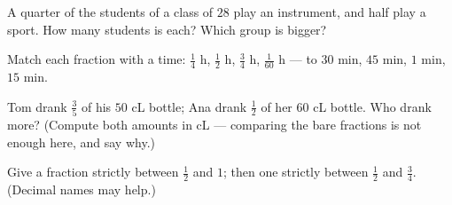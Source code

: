 \begin{exercise}[$\star$]\label{exo:g5:fractions:8}
A quarter of the students of a class of $28$ play an instrument, and
half play a sport. How many students is each? Which group is bigger?
\end{exercise}

\begin{exercise}[$\star$]\label{exo:g5:fractions:9}
Match each fraction with a time: $\frac14$ h, $\frac12$ h,
$\frac34$ h, $\frac{1}{60}$ h --- to $30$ min, $45$ min, $1$ min,
$15$ min.
\end{exercise}

\begin{exercise}[$\star\star$]\label{exo:g5:fractions:10}
Tom drank $\frac35$ of his $50$ cL bottle; Ana drank $\frac12$ of
her $60$ cL bottle. Who drank more? (Compute both amounts in cL ---
comparing the bare fractions is not enough here, and say why.)
\end{exercise}

\begin{exercise}[$\star\star$]\label{exo:g5:fractions:11}
Give a fraction strictly between $\frac12$ and $1$; then one
strictly between $\frac12$ and $\frac34$. (Decimal names may
help.)
\end{exercise}
